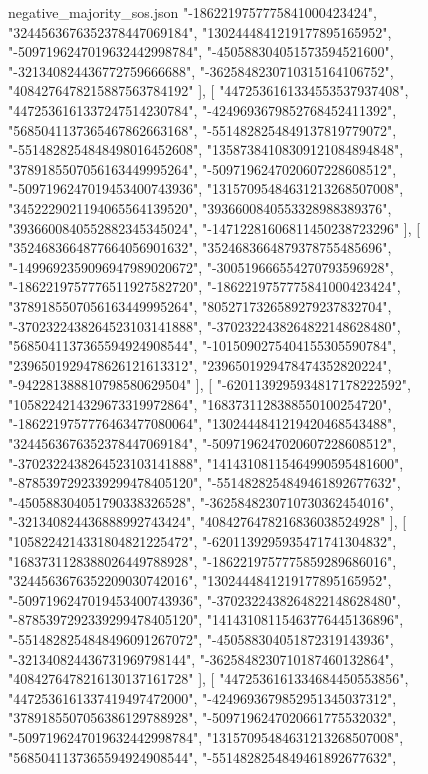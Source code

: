 \begin{filecontents*}[overwrite]{negative_majority_sos.json}
    "-1862219757775841000423424",
    "3244563676352378447069184",
    "1302444841219177895165952",
    "-5097196247019632442998784",
    "-450588304051573594521600",
    "-321340824436772759666688",
    "-3625848230710315164106752",
    "4084276478215887563784192"
   ],
   [
    "4472536161334553537937408",
    "4472536161337247514230784",
    "-4249693679852768452411392",
    "5685041137365467862663168",
    "-5514828254849137819779072",
    "-5514828254848498016452608",
    "13587384108309121084894848",
    "3789185507056163449995264",
    "-5097196247020607228608512",
    "-5097196247019453400743936",
    "13157095484631213268507008",
    "3452229021194065564139520",
    "3936600840553328988389376",
    "3936600840552882345345024",
    "-14712281606811450238723296"
   ],
   [
    "3524683664877664056901632",
    "3524683664879378755485696",
    "-1499692359096947989020672",
    "-300519666554270793596928",
    "-1862219757776511927582720",
    "-1862219757775841000423424",
    "3789185507056163449995264",
    "8052717326589279237832704",
    "-3702322438264523103141888",
    "-3702322438264822148628480",
    "5685041137365594924908544",
    "-1015090275404155305590784",
    "2396501929478626121613312",
    "2396501929478474352820224",
    "-942281388810798580629504"
   ],
   [
    "-6201139295934817178222592",
    "1058224214329673319972864",
    "1683731128388550100254720",
    "-1862219757776463477080064",
    "1302444841219420468543488",
    "3244563676352378447069184",
    "-5097196247020607228608512",
    "-3702322438264523103141888",
    "14143108115464990595481600",
    "-8785397292339299478405120",
    "-5514828254849461892677632",
    "-450588304051790338326528",
    "-3625848230710730362454016",
    "-321340824436888992743424",
    "4084276478216836038524928"
   ],
   [
    "1058224214331804821225472",
    "-6201139295935471741304832",
    "1683731128388026449788928",
    "-1862219757775859289686016",
    "3244563676352209030742016",
    "1302444841219177895165952",
    "-5097196247019453400743936",
    "-3702322438264822148628480",
    "-8785397292339299478405120",
    "14143108115463776445136896",
    "-5514828254848496091267072",
    "-450588304051872319143936",
    "-321340824436731969798144",
    "-3625848230710187460132864",
    "4084276478216130137161728"
   ],
   [
    "4472536161334684450553856",
    "4472536161337419497472000",
    "-4249693679852951345037312",
    "3789185507056386129788928",
    "-5097196247020661775532032",
    "-5097196247019632442998784",
    "13157095484631213268507008",
    "5685041137365594924908544",
    "-5514828254849461892677632",

\end{filecontents*}
